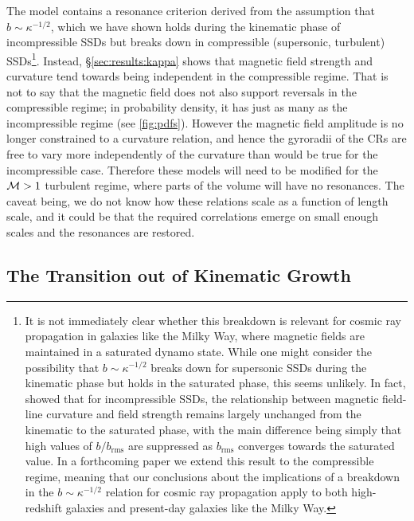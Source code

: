 The \citet{kempski2023cosmic} model contains a resonance criterion derived from the assumption that $b \sim \kappa^{-1/2}$, which we have shown holds during the kinematic phase of incompressible SSDs but breaks down in compressible (\ie supersonic, turbulent) SSDs\footnote{
    It is not immediately clear whether this breakdown is relevant for cosmic ray propagation in galaxies like the Milky Way, where magnetic fields are maintained in a saturated dynamo state. While one might consider the possibility that $b \sim \kappa^{-1/2}$ breaks down for supersonic SSDs during the kinematic phase but holds in the saturated phase, this seems unlikely. In fact, \citet{schekochihin2004simulations} showed that for incompressible SSDs, the relationship between magnetic field-line curvature and field strength remains largely unchanged from the kinematic to the saturated phase, with the main difference being simply that high values of $b/b_\mathrm{rms}$ are suppressed as $b_\mathrm{rms}$ converges towards the saturated value. In a forthcoming paper we extend this result to the compressible regime, meaning that our conclusions about the implications of a breakdown in the $b\sim\kappa^{-1/2}$ relation for cosmic ray propagation apply to both high-redshift galaxies and present-day galaxies like the Milky Way.
}. Instead, \S\ref{sec:results:kappa} shows that magnetic field strength and curvature tend towards being independent in the compressible regime. That is not to say that the magnetic field does not also support reversals in the compressible regime; in probability density, it has just as many as the incompressible regime (see \autoref{fig:pdfs}). However the magnetic field amplitude is no longer constrained to a curvature relation, and hence the gyroradii of the CRs are free to vary more independently of the curvature than would be true for the incompressible case. Therefore these models will need to be modified for the $\mathcal{M} > 1$ turbulent regime, where parts of the volume will have no resonances. The caveat being, we do not know how these relations scale as a function of length scale, and it could be that the required correlations emerge on small enough scales and the resonances are restored.

\subsection{The Transition out of Kinematic Growth}
\label{sec:discussion:saturation}


